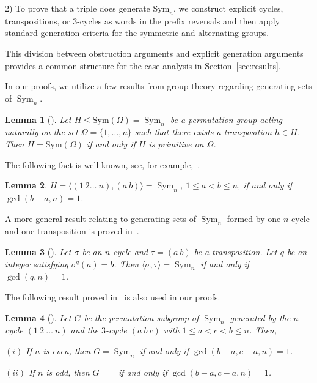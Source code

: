 \documentclass[
final
]{dmtcs-episciences}
\newtheorem{lemma}{Lemma}
\DeclareMathOperator{\Sym}{\mathrm{Sym}}
\DeclareMathOperator{\Alt}{\mathrm{Alt}_n}
\begin{document}
2) To prove that a triple does generate $\mathrm{Sym}_n$, we construct explicit cycles, transpositions, or $3$-cycles as words in the prefix reversals and then apply standard generation criteria for the symmetric and alternating groups. 

This division between obstruction arguments and explicit generation
arguments provides a common structure for the case analysis in Section~\ref{sec:results}.

In our proofs, we utilize a few results from group theory regarding generating sets of $\Sym_n$.

\begin{lemma}[{\rm\cite[Theorem~13.3]{W64}}]\label{WieLemma} Let $H \leqslant \text{Sym}(\Omega)=\Sym_n$ be a permutation group acting naturally on the set $\Omega=\{1, \ldots, n\}$ such that there exists a transposition $h \in H$. Then $H=\text{Sym}(\Omega)$ if and only if $H$ is primitive on $\Omega$. 
\end{lemma}

The following fact is well-known, see, for example,~\cite[Theorem~1.1]{IradmusaTaleb}.

\begin{lemma}\label{lem:Gen_(2,n)} $H=\langle (1\ 2 \ldots \ n),(a\ b)\rangle=\Sym_n$, $1 \leqslant a < b \leqslant n$, if and only if $\gcd(b - a, n) = 1$.
\end{lemma}

A more general result relating to generating sets of $\Sym_n$ formed by one $n$-cycle and one transposition is proved in~\cite{Janusz}. 

\begin{lemma}[{\rm\cite[Corollary 4]{Janusz}}]\label{lem:janusz} Let $\sigma$ be an $n$-cycle and $\tau=(a \ b)$ be a transposition. Let $q$ be an integer satisfying $\sigma^q(a)=b$. Then $\langle \sigma,\tau\rangle=\Sym_n$ if and only if $\gcd(q,n)=1$.
\end{lemma}

The following result proved in~\cite{IradmusaTaleb} is also used in our proofs. 

\begin{lemma}[{\rm\cite[Theorem~1.3]{IradmusaTaleb}}]\label{lem:Gen_(3,n)}
    Let $G$ be the permutation subgroup of $\Sym_n$ generated by the $n$-cycle $ (1\ 2\ \ldots \ n)$ and the $3$-cycle $(a\ b\ c)$ with $1\leqslant a < c < b \leqslant n$. Then, 
    
    $(i)$ If $n$ is even, then $G=\Sym_n$ if and only if $\gcd(b-a,c-a,n)=1$. 
    
    $(ii)$ If $n$ is odd, then 
    $G=\Alt$ if and only if $\gcd(b-a,c-a,n)=1$. 
\end{lemma}
\end{document}
